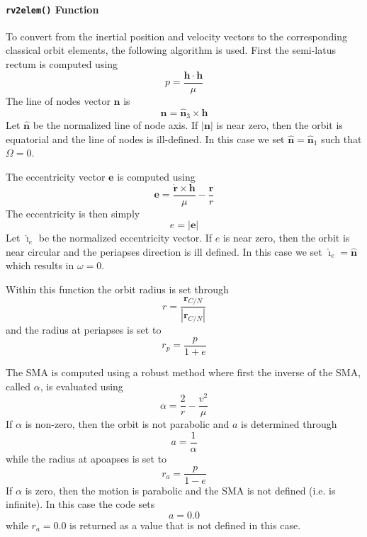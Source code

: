 \paragraph{{\tt rv2elem()} Function}
To convert from the inertial position and velocity vectors to the corresponding classical orbit elements, the following algorithm is used.  First the semi-latus rectum is computed using
\begin{equation}
	p = \frac{\bm h \cdot \bm h}{\mu}
\end{equation}
The line of nodes vector $\bm n$ is 
\begin{equation}
	\bm n = \hat{\bm n}_{3} \times \bm h
\end{equation}
Let $\hat{\bm n}$ be the normalized line of node axis. 
If $|\bm n|$ is near zero, then the orbit is equatorial and the line of nodes is ill-defined. In this case we set $\hat{\bm n} = \hat{\bm n}_{1}$ such that $\Omega = 0$.  

The eccentricity vector $\bm e$ is computed using\cite{schaub}
\begin{equation}
	\bm e = \frac{\dot{\bm r} \times \bm h}{\mu} - \frac{\bm r}{r}
\end{equation}
The eccentricity is then simply
\begin{equation}
	e = |\bm e|
\end{equation}
Let $\hat{\bm\imath}_{e}$ be the normalized eccentricity vector.
If $e$ is near zero, then the orbit is near circular and the periapses direction is ill defined.  In this case we set $\hat{\bm\imath}_{e} = \hat{\bm n}$ which results in $\omega = 0$.  

Within this function the orbit radius is set through
\begin{equation}
	r = \frac{\bm r_{C/N}}{ | \bm r_{C/N}|}
\end{equation}
and the radius at periapses is set to
\begin{equation}
	r_{p} = \frac{p}{1 + e}
\end{equation}

The SMA is computed using a robust method where first the inverse of the SMA, called $\alpha$, is evaluated using\cite{schaub}
\begin{equation}
	\alpha = \frac{2}{r} - \frac{v^{2}}{\mu}
\end{equation}
If $\alpha$ is non-zero, then the orbit is not parabolic and $a$ is determined through
\begin{equation}
	a = \frac{1}{\alpha}
\end{equation}
while the radius at apoapses is set to
\begin{equation}
	r_{a} = \frac{p}{1 - e}
\end{equation}
If $\alpha$ is zero, then the motion is parabolic and the SMA is not defined (i.e. is infinite).  In this case the code sets 
$$
	a = 0.0
$$
while $r_{a} = 0.0$ is returned as a value that is not defined in this case.


